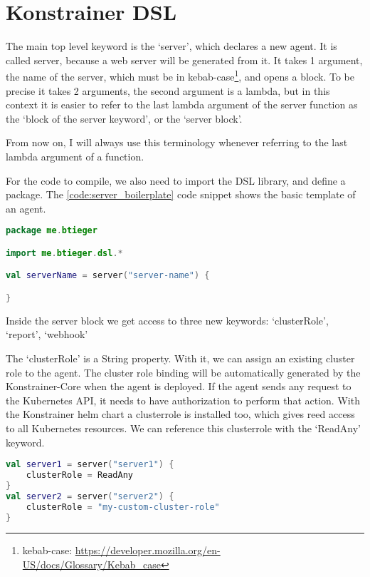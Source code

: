\chapter{Konstrainer DSL}

The main top level keyword is the `server', which declares a new agent. It is called server, because a web server will be generated from it. It takes 1 argument, the name of the server, which must be in kebab-case\footnote{kebab-case: \url{https://developer.mozilla.org/en-US/docs/Glossary/Kebab_case}}, and opens a block. To be precise it takes 2 arguments, the second argument is a lambda, but in this context it is easier to refer to the last lambda argument of the server function as the `block of the server keyword', or the `server block'.

From now on, I will always use this terminology whenever referring to the last lambda argument of a function.

For the code to compile, we also need to import the DSL library, and define a package. The \ref{code:server_boilerplate} code snippet shows the basic template of an agent.

\begin{lstlisting}[caption={Template of a DSL file},language=Kotlin,label=code:server_boilerplate]
package me.btieger

import me.btieger.dsl.*

val serverName = server("server-name") {

}
\end{lstlisting}

Inside the server block we get access to three new keywords: `clusterRole', `report', `webhook'

The `clusterRole' is a String property. With it, we can assign an existing cluster role to the agent. The cluster role binding will be automatically generated by the Konstrainer-Core when the agent is deployed. If the agent sends any request to the Kubernetes API, it needs to have authorization to perform that action. With the Konstrainer helm chart a clusterrole is installed too, which gives reed access to all Kubernetes resources. We can reference this clusterrole with the `ReadAny' keyword.

\begin{lstlisting}[caption={Usage of the clusterRole keyword},language=Kotlin,label=code:clusterrole_usage]
val server1 = server("server1") {
    clusterRole = ReadAny
}
val server2 = server("server2") {
    clusterRole = "my-custom-cluster-role"
}
\end{lstlisting}


